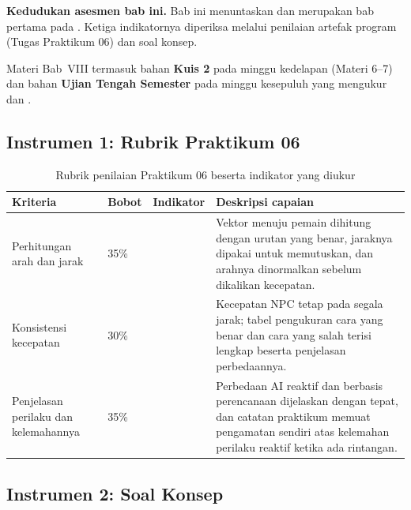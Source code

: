 \label{sec:asesmen-chase}

\begin{asesmenbox}
\textbf{Kedudukan asesmen bab ini.} Bab ini menuntaskan  dan
merupakan bab pertama pada . Ketiga indikatornya diperiksa melalui
penilaian artefak program (Tugas Praktikum 06) dan soal konsep.

\vspace{0.4em}
Materi Bab~VIII termasuk bahan \textbf{Kuis 2} pada minggu kedelapan
(Materi 6--7) dan bahan \textbf{Ujian Tengah Semester} pada minggu kesepuluh
yang mengukur  dan .
\end{asesmenbox}

\subsection*{Instrumen 1: Rubrik Praktikum 06}

\begin{table}[htbp]
\centering
\caption{Rubrik penilaian Praktikum 06 beserta indikator yang diukur}
\label{tab:rubrik-praktikum-06}
{\setlength{\tabcolsep}{4pt}\footnotesize%
\begin{tabularx}{\textwidth}{@{}L{3.2cm} C{1.3cm} C{2.1cm} Y@{}}
\toprule
\headrow \textbf{Kriteria} & \textbf{Bobot} & \textbf{Indikator} & \textbf{Deskripsi capaian} \\
\midrule
Perhitungan arah dan jarak & 35\% &  &
Vektor menuju pemain dihitung dengan urutan yang benar, jaraknya dipakai untuk
memutuskan, dan arahnya dinormalkan sebelum dikalikan kecepatan. \\
\addlinespace
Konsistensi kecepatan & 30\% &  &
Kecepatan NPC tetap pada segala jarak; tabel pengukuran cara yang benar dan
cara yang salah terisi lengkap beserta penjelasan perbedaannya. \\
\addlinespace
Penjelasan perilaku dan kelemahannya & 35\% &  &
Perbedaan AI reaktif dan berbasis perencanaan dijelaskan dengan tepat, dan
catatan praktikum memuat pengamatan sendiri atas kelemahan perilaku reaktif
ketika ada rintangan. \\
\bottomrule
\end{tabularx}}
\end{table}

\subsection*{Instrumen 2: Soal Konsep}

